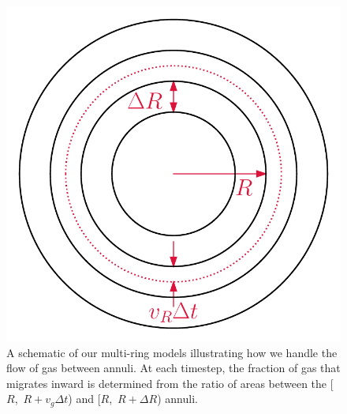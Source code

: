 \begin{figure}
\centering
\includegraphics[scale = 0.5]{chapter7/schematic.pdf}
\caption{
A schematic of our multi-ring models illustrating how we handle the flow of gas
between annuli.
At each timestep, the fraction of gas that migrates inward is determined from
the ratio of areas between the [$R$,~$R + v_g \Delta t$) and
[$R$,~$R + \Delta R$) annuli.
}
\label{outflows:fig:schematic}
\end{figure}

